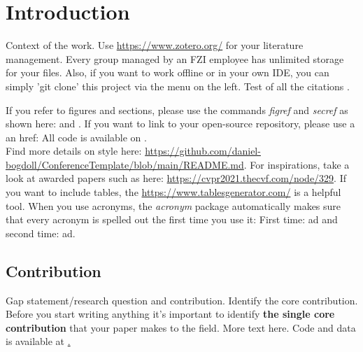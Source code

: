 \section{Introduction}
\label{sec:introduction}

Context of the work. Use \url{https://www.zotero.org/} for your literature management. Every group managed by an FZI employee has unlimited storage for your files. Also, if you want to work offline or in your own IDE, you can simply 'git clone' this project via the menu on the left. Test of all the citations
\cite{Bogdoll_Quantification_2022_arXiv}
\cite{Bogdoll_addatasets_2022_arXiv}
\cite{Bogdoll_Compressing_2021_NeurIPS}
\cite{Bogdoll_Description_2021_ICCV}
\cite{Bogdoll_KIGLIS_2021_ISC2}
\cite{Bogdoll_Taxonomy_2021_arXiv}
\cite{Toettel_Reliving_2021_arXiv}
\cite{Reichert_Towards_2021_ISC2}
\cite{Asam_Openscenario_2020_Web}
\cite{Bogdoll_Augmenting_2017_US}
\cite{Koduri_Aureate_2018_WCX}.

If you refer to figures and sections, please use the commands \textit{figref} and \textit{secref} as shown here:  and . If you want to link to your open-source repository, please use a an href: All code is available on \href{https://github.com/daniel-bogdoll/deep_generative_models}{\color{wong-lightblue}{GitHub}}. \\

Find more details on style here: \url{https://github.com/daniel-bogdoll/ConferenceTemplate/blob/main/README.md}. For inspirations, take a look at awarded papers such as here: \url{https://cvpr2021.thecvf.com/node/329}. If you want to include tables, the \url{https://www.tablesgenerator.com/} is a helpful tool. When you use acronyms, the \textit{acronym} package automatically makes sure that every acronym is spelled out the first time you use it: First time: \ac{ad} and second time: \ac{ad}.

\subsection{Contribution}
Gap statement/research question and contribution. Identify the core contribution. Before you start writing anything it’s important to identify \textbf{the single core contribution} that your paper makes to the field. More text here. Code and data is
available at \href{https://github.com/xxxxx}.

